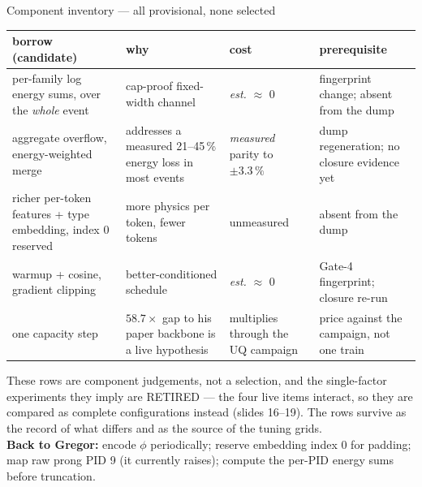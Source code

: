 \documentclass[aspectratio=169,10pt]{beamer}
\newcommand{\warn}[1]{\textcolor{warn}{#1}}
\begin{document}
\begin{frame}{Component inventory --- all provisional, none selected}
  \begin{center}\scriptsize
  \begin{tabular}{@{}R{0.30\textwidth}R{0.20\textwidth}R{0.20\textwidth}R{0.24\textwidth}@{}}
    \toprule
    \textbf{borrow (candidate)} & \textbf{why} & \textbf{cost} &
      \textbf{prerequisite} \\
    \midrule
    per-family log energy sums, over the \emph{whole} event &
      cap-proof fixed-width channel &
      \emph{est.} $\approx$ 0 &
      fingerprint change; \warn{absent from the dump} \\
    aggregate overflow, energy-weighted merge &
      addresses a measured 21--45\,\% energy loss in most events &
      \emph{measured} parity to $\pm3.3\,\%$ &
      dump regeneration; \warn{no closure evidence yet} \\
    richer per-token features + type embedding, index 0 reserved &
      more physics per token, fewer tokens &
      unmeasured &
      \warn{absent from the dump} \\
    warmup + cosine, gradient clipping &
      better-conditioned schedule &
      \emph{est.} $\approx$ 0 &
      Gate-4 fingerprint; closure re-run \\
    one capacity step &
      $58.7\times$ gap to his paper backbone is a live hypothesis &
      multiplies through the UQ campaign &
      price against the campaign, not one train \\
    \bottomrule
  \end{tabular}
  \end{center}
  \vspace{0.4em}
  {\footnotesize
  \warn{These rows are component judgements, not a selection, and the single-factor
  experiments they imply are RETIRED} --- the four live items interact, so they are
  compared as complete configurations instead (slides 16--19). The rows survive as the record
  of what differs and as the source of the tuning grids.
  \\[0.2em]
  \textbf{Back to Gregor:} encode $\phi$ periodically; reserve embedding index 0 for
  padding; map raw prong PID 9 (it currently raises); compute the per-PID energy sums
  before truncation.}
\end{frame}
\end{document}
